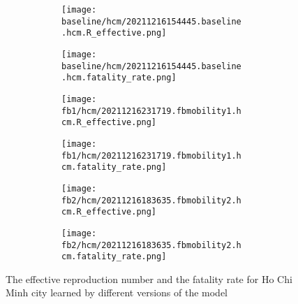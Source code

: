 \begin{figure}[!htb]
    \centering

    \begin{subfigure}[b]{\linewidth}
        \centering
        \begin{subfigure}[b]{0.4\linewidth}
            \texttt{[image: baseline/hcm/20211216154445.baseline.hcm.R\_effective.png]}
        \end{subfigure}
        \begin{subfigure}[b]{0.4\linewidth}
            \texttt{[image: baseline/hcm/20211216154445.baseline.hcm.fatality\_rate.png]}
        \end{subfigure}
    \end{subfigure}

    \begin{subfigure}[b]{\linewidth}
        \centering
        \begin{subfigure}[b]{0.4\linewidth}
            \texttt{[image: fb1/hcm/20211216231719.fbmobility1.hcm.R\_effective.png]}
        \end{subfigure}
        \begin{subfigure}[b]{0.4\linewidth}
            \texttt{[image: fb1/hcm/20211216231719.fbmobility1.hcm.fatality\_rate.png]}
        \end{subfigure}
    \end{subfigure}

    \begin{subfigure}[b]{\linewidth}
        \centering
        \begin{subfigure}[b]{0.4\linewidth}
            \texttt{[image: fb2/hcm/20211216183635.fbmobility2.hcm.R\_effective.png]}
        \end{subfigure}
        \begin{subfigure}[b]{0.4\linewidth}
            \texttt{[image: fb2/hcm/20211216183635.fbmobility2.hcm.fatality\_rate.png]}
        \end{subfigure}
    \end{subfigure}

    \caption{The effective reproduction number and the fatality rate for Ho Chi Minh city learned by different versions of the model}
    \label{fig:R0-and-fatality-hochiminh}
\end{figure}

